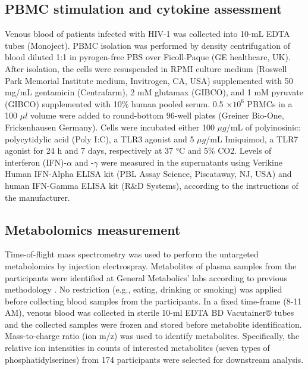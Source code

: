 \documentclass{book}
\begin{document}
\begin{refsection}
\subsection*{PBMC stimulation and cytokine assessment}
Venous blood of patients infected with HIV-1 was collected into 10-mL EDTA tubes (Monoject).
PBMC isolation was performed by density centrifugation of blood diluted 1:1 in pyrogen-free PBS over Ficoll-Paque (GE healthcare, UK).
After isolation, the cells were resuspended in RPMI culture medium (Roswell Park Memorial Institute medium, Invitrogen, CA, USA) supplemented with 50 mg/mL gentamicin (Centrafarm), 2 mM glutamax (GIBCO), and 1 mM pyruvate (GIBCO) supplemented with 10\% human pooled serum.
0.5 $\times 10^6$ PBMCs in a 100 $\mu l$ volume were added to round-bottom 96-well plates (Greiner Bio-One, Frickenhausen Germany).
Cells were incubated either 100 $\mu g$/mL of polyinosinic: polycytidylic acid (Poly I:C), a TLR3 agonist and 5 $\mu g$/mL Imiquimod, a TLR7 agonist for 24 h and 7 days, respectively at 37 °C and 5\% CO2.
Levels of interferon (IFN)-$\alpha$ and -$\gamma$ were measured in the supernatants using Verikine Human IFN-Alpha ELISA kit (PBL Assay Science, Piscataway, NJ, USA) and human IFN-Gamma ELISA kit (R\&D Systems), according to the instructions of the manufacturer.

\subsection*{Metabolomics measurement}
Time-of-flight mass spectrometry was used to perform the untargeted metabolomics by injection electrospray.
Metabolites of plasma samples from the participants were identified at General Metabolics' labs according to previous methodology \cite{Fuhrer2011High}.
No restriction (e.g., eating, drinking or smoking) was applied before collecting blood samples from the participants.
In a fixed time-frame (8-11 AM), venous blood was collected in sterile 10-ml EDTA BD Vacutainer® tubes and the collected samples were frozen and stored before metabolite identification.
Mass-to-charge ratio (ion m/z) was used to identify metabolites.
Specifically, the relative ion intensities in counts of interested metabolites (seven types of phosphatidylserines) from 174 participants were selected for downstream analysis.


\end{refsection}
\end{document}
